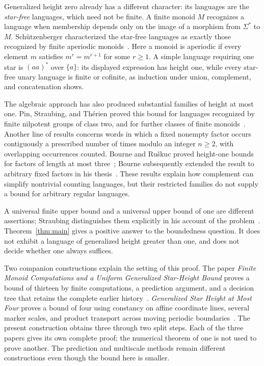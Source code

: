 Generalized height zero already has a different character: its languages
are the \emph{star-free} languages, which need not be finite. A finite
monoid $M$ recognizes a language when membership depends only on the image
of a morphism from $\Sigma^*$ to $M$. Sch\"utzenberger characterized the
star-free languages as exactly those recognized by finite aperiodic
monoids~\cite{Schutzenberger1965}. Here a monoid is aperiodic if every
element $m$ satisfies $m^r=m^{r+1}$ for some $r\ge1$. A simple language
requiring one star is $(aa)^*$ over $\{a\}$: its displayed expression has
height one, while every star-free unary language is finite or cofinite,
as induction under union, complement, and concatenation shows.

The algebraic approach has also produced substantial families of height
at most one. Pin, Straubing, and Th\'erien proved this bound for languages
recognized by finite nilpotent groups of class two, and for further
classes of finite monoids~\cite[Theorems~7.3 and~7.8]{PST1992}.
Another line of results concerns words in which a fixed nonempty factor
occurs contiguously a prescribed number of times modulo an integer
$n\ge2$, with overlapping occurrences counted. Bourne and Ru\v{s}kuc
proved height-one bounds for factors of length at most
three~\cite[Proposition~2.5]{BourneRuskuc2016};
Bourne subsequently extended the result to arbitrary fixed factors
in his thesis~\cite[Theorem~2.25]{Bourne2017}. These results explain how
complement can simplify nontrivial counting languages, but their
restricted families do not supply a bound for arbitrary regular languages.

A universal finite upper bound and a universal upper bound of one are
different assertions; Straubing distinguishes them explicitly in his
account of the problem~\cite[p.~537]{Straubing2002}.
Theorem~\ref{thm:main} gives a positive answer to the boundedness question.
It does not exhibit a language of generalized height greater than one,
and does not decide whether one always suffices.

Two companion constructions explain the setting of this proof. The paper
\emph{Finite Monoid Computations and a Uniform Generalized Star-Height
Bound} proves a bound of thirteen by finite computations, a prediction
argument, and a decision tree that retains the complete earlier
history~\cite[Theorem~1.1 and Sections~2--7]{HeightThirteen}.
\emph{Generalized Star Height at Most Four} proves a bound of four using
constancy on affine coordinate lines, several marker scales, and product
transport across moving periodic
boundaries~\cite[Theorem~1.1 and Sections~2--6]{HeightFour}.
The present construction obtains three through two split steps. Each of
the three papers gives its own complete proof; the numerical theorem of
one is not used to prove another. The prediction and multiscale methods
remain different constructions even though the bound here is smaller.


